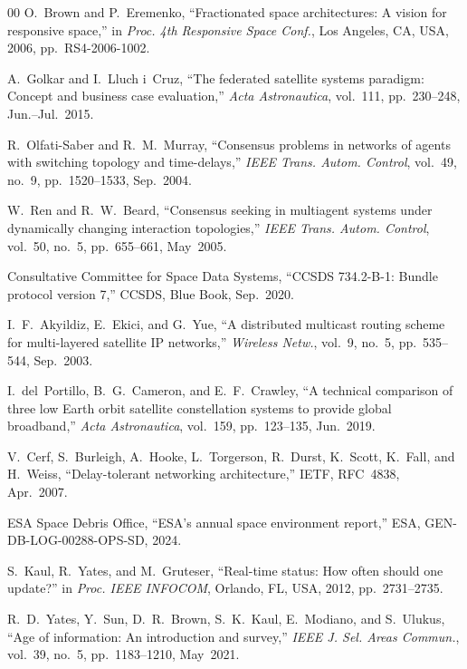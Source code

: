 \documentclass[journal]{IEEEtran}
\begin{document}
\begin{thebibliography}{00}
O.~Brown and P.~Eremenko, ``Fractionated space architectures: A vision for responsive space,'' in \emph{Proc. 4th Responsive Space Conf.}, Los Angeles, CA, USA, 2006, pp.~RS4-2006-1002.

A.~Golkar and I.~Lluch i~Cruz, ``The federated satellite systems paradigm: Concept and business case evaluation,'' \emph{Acta Astronautica}, vol.~111, pp.~230--248, Jun.--Jul.~2015.

R.~Olfati-Saber and R.~M.~Murray, ``Consensus problems in networks of agents with switching topology and time-delays,'' \emph{IEEE Trans. Autom. Control}, vol.~49, no.~9, pp.~1520--1533, Sep.~2004.

W.~Ren and R.~W.~Beard, ``Consensus seeking in multiagent systems under dynamically changing interaction topologies,'' \emph{IEEE Trans. Autom. Control}, vol.~50, no.~5, pp.~655--661, May~2005.

Consultative Committee for Space Data Systems, ``CCSDS 734.2-B-1: Bundle protocol version 7,'' CCSDS, Blue Book, Sep.~2020.

I.~F.~Akyildiz, E.~Ekici, and G.~Yue, ``A distributed multicast routing scheme for multi-layered satellite IP networks,'' \emph{Wireless Netw.}, vol.~9, no.~5, pp.~535--544, Sep.~2003.

I.~del~Portillo, B.~G.~Cameron, and E.~F.~Crawley, ``A technical comparison of three low Earth orbit satellite constellation systems to provide global broadband,'' \emph{Acta Astronautica}, vol.~159, pp.~123--135, Jun.~2019.

V.~Cerf, S.~Burleigh, A.~Hooke, L.~Torgerson, R.~Durst, K.~Scott, K.~Fall, and H.~Weiss, ``Delay-tolerant networking architecture,'' IETF, RFC~4838, Apr.~2007.

ESA Space Debris Office, ``ESA's annual space environment report,'' ESA, GEN-DB-LOG-00288-OPS-SD, 2024.

S.~Kaul, R.~Yates, and M.~Gruteser, ``Real-time status: How often should one update?'' in \emph{Proc. IEEE INFOCOM}, Orlando, FL, USA, 2012, pp.~2731--2735.

R.~D.~Yates, Y.~Sun, D.~R.~Brown, S.~K.~Kaul, E.~Modiano, and S.~Ulukus, ``Age of information: An introduction and survey,'' \emph{IEEE J. Sel. Areas Commun.}, vol.~39, no.~5, pp.~1183--1210, May~2021.


\end{thebibliography}
\end{document}
